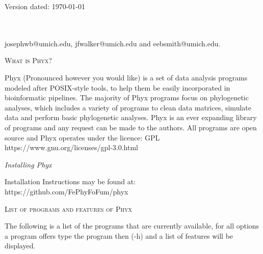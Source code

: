 \documentclass[12pt,letterpaper]{article}
\renewcommand{\section}[1]{%
\bigskip
\begin{center}
\begin{Large}
\normalfont\scshape #1
\medskip
\end{Large}
\end{center}}
\renewcommand{\subsection}[1]{%
\bigskip
\begin{center}
\begin{large}
\normalfont\itshape #1
\end{large}
\end{center}}
\begin{document}
\begin{flushright}
Version dated: \today
\end{flushright}
\bigskip

\\
\\

\medskip
{} josephwb@umich.edu, jfwalker@umich.edu and eebsmith@umich.edu.\\
\medskip

\vspace{1in}

\section{What is Phyx?}\label{abstract}
Phyx (Pronounced however you would like) is a set of data analysis programs modeled after POSIX-style tools, to help them be easily incorporated in bioinformatic pipelines. The majority of Phyx programs focus on phylogenetic analyses, which includes a variety of programs to clean data matrices, simulate data and perform basic phylogenetic analyses. Phyx is an ever expanding library of programs and any request can be made to the authors. 
All programs are open source and Phyx operates under the licence: GPL https://www.gnu.org/licenses/gpl-3.0.html

\subsection{Installing Phyx}\label{introduction}
\begin{flushleft}
Installation Instructions may be found at: https://github.com/FePhyFoFum/phyx

\end{flushleft}
\section{List of programs and features of Phyx}

The following is a list of the programs that are currently available, for all options a program offers type the program then (-h) and a list of features will be displayed.
\end{document}
